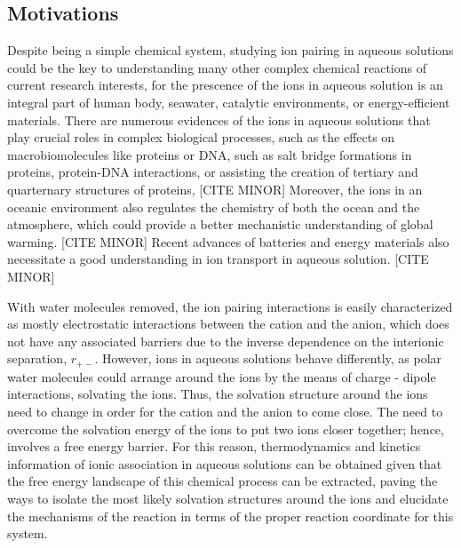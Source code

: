 \begin{spacing}{2.0}

    \section{Motivations}

    Despite being a simple chemical system, studying ion pairing in aqueous solutions could be the key to understanding many other complex 
    chemical reactions of current research interests, for the prescence of the ions in aqueous solution is an integral part of human body, 
    seawater, catalytic environments, or energy-efficient materials. There are numerous evidences of the ions in aqueous solutions that play 
    crucial roles in complex biological processes, such as the effects on macrobiomolecules like proteins or DNA, such as salt bridge formations 
    in proteins, protein-DNA interactions, or assisting the creation of tertiary and quarternary structures of proteins, [CITE MINOR] Moreover, 
    the ions in an oceanic environment also regulates the chemistry of both the ocean and the atmosphere, which could provide a better 
    mechanistic understanding of global warming. [CITE MINOR] Recent advances of batteries and energy materials also necessitate a good 
    understanding in ion transport in aqueous solution. [CITE MINOR]

    With water molecules removed, the ion pairing interactions is easily characterized as mostly electrostatic interactions between the cation 
    and the anion, which does not have any associated barriers due to the inverse dependence on the interionic separation, $r_{+-}$. However, ions 
    in aqueous solutions behave differently, as polar water molecules could arrange around the ions by the means of charge - dipole interactions, 
    solvating the ions. Thus, the solvation structure around the ions need to change in order for the cation and the anion to come close. The need 
    to overcome the solvation energy of the ions to put two ions closer together; hence, involves a free energy barrier. For this reason, 
    thermodynamics and kinetics information of ionic association in aqueous solutions can be obtained given that the free energy landscape of this 
    chemical process can be extracted, paving the ways to isolate the most likely solvation structures around the ions and elucidate the mechanisms 
    of the reaction in terms of the proper reaction coordinate for this system.


\end{spacing}
